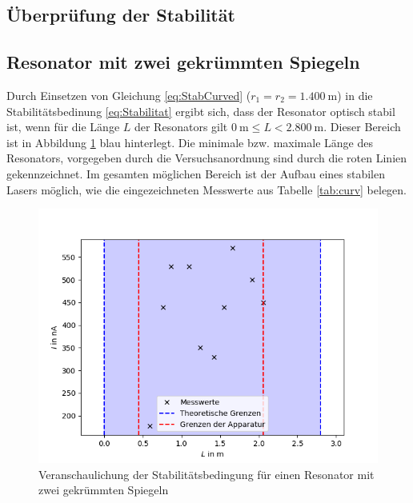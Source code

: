 \subsection{Überprüfung der Stabilität}
\subsection{Resonator mit zwei gekrümmten Spiegeln\label{sec:curved}}
Durch Einsetzen von Gleichung \eqref{eq:StabCurved} ($r_1 = r_2 = \SI{1.400}{\metre}$) in die Stabilitätsbedinung \eqref{eq:Stabilitat} ergibt sich, dass der Resonator optisch stabil ist, wenn für die Länge $L$ der Resonators gilt $\SI{0}{\metre}\leq L<\SI{2.800}{\metre}$. Dieser Bereich ist in Abbildung \ref{fig:curved} blau hinterlegt. Die minimale bzw. maximale Länge des Resonators, vorgegeben durch die Versuchsanordnung sind durch die roten Linien gekennzeichnet. Im gesamten möglichen Bereich ist der Aufbau eines stabilen Lasers möglich, wie die eingezeichneten Messwerte aus Tabelle \ref{tab:curv} belegen.

\begin{figure}[h!]
	\centering
	\includegraphics[width=.7\textwidth]{PlotCurved2.png}
	\caption{Veranschaulichung der Stabilitätsbedingung für einen Resonator mit zwei gekrümmten Spiegeln}
	\label{fig:curved}
\end{figure}
\clearpage

